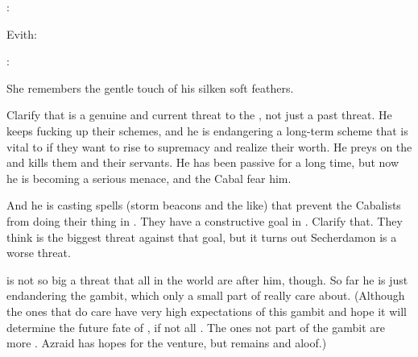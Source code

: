 \begin{prose}
  \Teshrial: 
  
  Evith: 
  
  \Teshrial: 
\end{prose}

She remembers the gentle touch of his silken soft feathers. 









\begin{comment}
\subsection{Ishnaruchaefir is a menace}
\end{comment}
\new
Clarify that \Ishnaruchaefir is a genuine and current threat to the \resphain, not just a past threat.
He keeps fucking up their schemes, and he is endangering a long-term scheme that is vital to \CiriathSepher if they want to rise to supremacy and realize their worth.
He preys on the \resphain and kills them and their servants. 
He has been passive for a long time, but now he is becoming a serious menace, and the Cabal fear him.

And he is casting spells (storm beacons and the like) that prevent the Cabalists from doing their thing in \Malcur.
They have a constructive goal in \Malcur. 
Clarify that.
They think \Ishnaruchaefir is the biggest threat against that goal, but it turns out Secherdamon is a worse threat. 

\Ishnaruchaefir is not so big a threat that all \resphain in the world are after him, though.
So far he is just endandering the \Malcur gambit, which only a small part of \CiriathSepher really care about. 
(Although the ones that do care have very high expectations of this gambit and hope it will determine the future fate of \CiriathSepher, if not all \resphain. 
 The ones not part of the gambit are more \skeptical. 
 Azraid has hopes for the venture, but remains \skeptical and aloof.)

